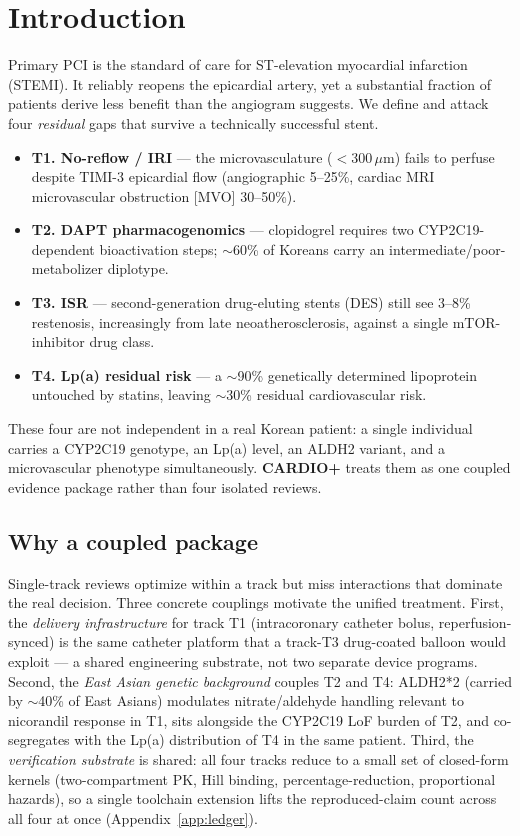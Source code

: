 \documentclass[11pt]{article}
\begin{document}
\tableofcontents
\newpage

\section{Introduction}
\label{sec:intro}

Primary PCI is the standard of care for ST-elevation myocardial infarction (STEMI). It reliably reopens the epicardial artery, yet a substantial fraction of patients derive less benefit than the angiogram suggests. We define and attack four \emph{residual} gaps that survive a technically successful stent.

\begin{itemize}
  \item \textbf{T1. No-reflow / IRI} --- the microvasculature ($<$300\,$\mu$m) fails to perfuse despite TIMI-3 epicardial flow (angiographic 5--25\%, cardiac MRI microvascular obstruction [MVO] 30--50\%).
  \item \textbf{T2. DAPT pharmacogenomics} --- clopidogrel requires two CYP2C19-dependent bioactivation steps; $\sim$60\% of Koreans carry an intermediate/poor-metabolizer diplotype.
  \item \textbf{T3. ISR} --- second-generation drug-eluting stents (DES) still see 3--8\% restenosis, increasingly from late neoatherosclerosis, against a single mTOR-inhibitor drug class.
  \item \textbf{T4. Lp(a) residual risk} --- a $\sim$90\% genetically determined lipoprotein untouched by statins, leaving $\sim$30\% residual cardiovascular risk.
\end{itemize}

These four are not independent in a real Korean patient: a single individual carries a CYP2C19 genotype, an Lp(a) level, an ALDH2 variant, and a microvascular phenotype simultaneously. \textbf{CARDIO+} treats them as one coupled evidence package rather than four isolated reviews.

\subsection{Why a coupled package}
Single-track reviews optimize within a track but miss interactions that dominate the real decision. Three concrete couplings motivate the unified treatment. First, the \emph{delivery infrastructure} for track T1 (intracoronary catheter bolus, reperfusion-synced) is the same catheter platform that a track-T3 drug-coated balloon would exploit --- a shared engineering substrate, not two separate device programs. Second, the \emph{East Asian genetic background} couples T2 and T4: ALDH2*2 (carried by $\sim$40\% of East Asians) modulates nitrate/aldehyde handling relevant to nicorandil response in T1, sits alongside the CYP2C19 LoF burden of T2, and co-segregates with the Lp(a) distribution of T4 in the same patient. Third, the \emph{verification substrate} is shared: all four tracks reduce to a small set of closed-form kernels (two-compartment PK, Hill binding, percentage-reduction, proportional hazards), so a single toolchain extension lifts the reproduced-claim count across all four at once (Appendix~\ref{app:ledger}).
\end{document}
